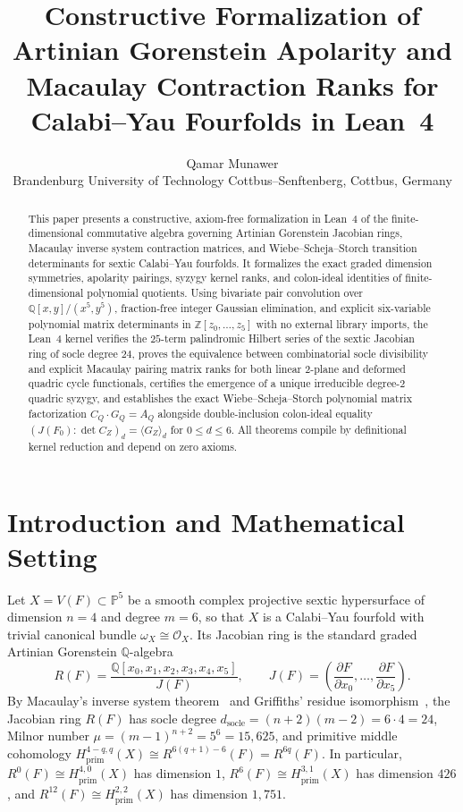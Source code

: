 \documentclass[11pt,a4paper]{article}
\title{\textbf{Constructive Formalization of Artinian Gorenstein Apolarity and Macaulay Contraction Ranks for Calabi--Yau Fourfolds in Lean~4}}
\author{
  Qamar Munawer\\
  \small Brandenburg University of Technology Cottbus--Senftenberg, Cottbus, Germany
}
\date{}
\begin{document}
\maketitle

\begin{abstract}
This paper presents a constructive, axiom-free formalization in Lean~4 of the finite-dimensional commutative algebra governing Artinian Gorenstein Jacobian rings, Macaulay inverse system contraction matrices, and Wiebe--Scheja--Storch transition determinants for sextic Calabi--Yau fourfolds. It formalizes the exact graded dimension symmetries, apolarity pairings, syzygy kernel ranks, and colon-ideal identities of finite-dimensional polynomial quotients. Using bivariate pair convolution over $\mathbb{Q}[x,y]/(x^5,y^5)$, fraction-free integer Gaussian elimination, and explicit six-variable polynomial matrix determinants in $\mathbb{Z}[z_0,\dots,z_5]$ with no external library imports, the Lean~4 kernel verifies the $25$-term palindromic Hilbert series of the sextic Jacobian ring of socle degree $24$, proves the equivalence between combinatorial socle divisibility and explicit Macaulay pairing matrix ranks for both linear $2$-plane and deformed quadric cycle functionals, certifies the emergence of a unique irreducible degree-$2$ quadric syzygy, and establishes the exact Wiebe--Scheja--Storch polynomial matrix factorization $C_Q \cdot G_Q = A_Q$ alongside double-inclusion colon-ideal equality $(J(F_0) : \det C_Z)_d = \langle G_Z \rangle_d$ for $0 \le d \le 6$. All theorems compile by definitional kernel reduction and depend on zero axioms.
\end{abstract}

\section{Introduction and Mathematical Setting}

Let $X = V(F) \subset \mathbb{P}^5$ be a smooth complex projective sextic hypersurface of dimension $n = 4$ and degree $m = 6$, so that $X$ is a Calabi--Yau fourfold with trivial canonical bundle $\omega_X \cong \mathcal{O}_X$. Its Jacobian ring is the standard graded Artinian Gorenstein $\mathbb{Q}$-algebra
\begin{equation}
  R(F) = \frac{\mathbb{Q}[x_0, x_1, x_2, x_3, x_4, x_5]}{J(F)}, \qquad J(F) = \left(\frac{\partial F}{\partial x_0}, \dots, \frac{\partial F}{\partial x_5}\right).
\end{equation}
By Macaulay's inverse system theorem~\cite{Macaulay1916} and Griffiths' residue isomorphism~\cite{Griffiths1969,CarlsonGriffiths1980}, the Jacobian ring $R(F)$ has socle degree $d_{\mathrm{socle}} = (n + 2)(m - 2) = 6 \cdot 4 = 24$, Milnor number $\mu = (m - 1)^{n+2} = 5^6 = 15{,}625$, and primitive middle cohomology $H^{4-q,q}_{\mathrm{prim}}(X) \cong R^{6(q+1)-6}(F) = R^{6q}(F)$. In particular, $R^0(F) \cong H^{4,0}_{\mathrm{prim}}(X)$ has dimension $1$, $R^6(F) \cong H^{3,1}_{\mathrm{prim}}(X)$ has dimension $426$, and $R^{12}(F) \cong H^{2,2}_{\mathrm{prim}}(X)$ has dimension $1{,}751$.
\end{document}
